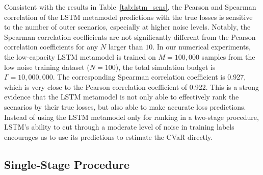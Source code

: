 \documentclass{article}
\begin{document}
Consistent with the results in Table~\ref{tab:lstm_sens}, the Pearson and Spearman correlation of the LSTM metamodel predictions with the true losses is sensitive to the number of outer scenarios, especially at higher noise levels.
Notably, the Spearman correlation coefficients are not significantly different from the Pearson correlation coefficients for any $N$ larger than $10$.
In our numerical experiments, the low-capacity LSTM metamodel is trained on $M = 100\!,000$ samples from the low noise training dataset ($N=100$), the total simulation budget is $\Gamma = 10\!,000\!,000$.
The corresponding Spearman correlation coefficient is 0.927, which is very close to the Pearson correlation coefficient of 0.922.
This is a strong evidence that the LSTM metamodel is not only able to effectively rank the scenarios by their true losses, but also able to make accurate loss predictions.
Instead of using the LSTM metamodel only for ranking in a two-stage procedure, LSTM's ability to cut through a moderate level of noise in training labels encourages us to use its predictions to estimate the CVaR directly. 


\subsection{Single-Stage Procedure}
\end{document}
